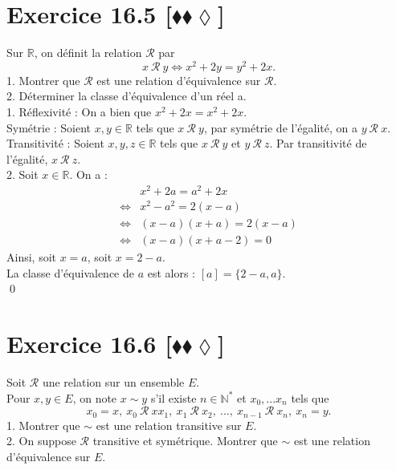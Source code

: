 \documentclass[10pt]{article}
\begin{document}
\section*{Exercice 16.5 [$\blacklozenge\blacklozenge\lozenge$]}
\begin{tcolorbox}[enhanced, width=7.6in, center, size=fbox, fontupper=\large, drop shadow southwest]
    Sur $\mathbb{R}$, on définit la relation $\mathcal{R}$ par
    \begin{equation*}
        x~\mathcal{R}~y \iff x^2 + 2y = y^2 + 2x.
    \end{equation*}
    1. Montrer que $\mathcal{R}$ est une relation d'équivalence sur $\mathcal{R}$.\\
    2. Déterminer la classe d'équivalence d'un réel a.\\[0.15cm]
    1. Réflexivité : On a bien que $x^2 + 2x = x^2 + 2x$.\\
    Symétrie : Soient $x,y\in\mathbb{R}$ tels que $x~\mathcal{R}~y$, par symétrie de l'égalité, on a $y~\mathcal{R}~x$.\\
    Transitivité : Soient $x,y,z\in\mathbb{R}$ tels que $x~\mathcal{R}~y$ et $y~\mathcal{R}~z$. Par transitivité de l'égalité, $x~\mathcal{R}~z$.\\[0.15cm]
    2. Soit $x\in\mathbb{R}$. On a :
    \begin{align*}
        &x^2 + 2a = a^2 + 2x\\
        \iff&x^2 - a^2 = 2(x-a)\\
        \iff&(x-a)(x+a)=2(x-a)\\
        \iff&(x-a)(x+a-2)=0
    \end{align*}
    Ainsi, soit $x=a$, soit $x=2-a$.\\
    La classe d'équivalence de $a$ est alors : $[a]=\{2-a,a\}$.\\
    \qed
\end{tcolorbox}

\section*{Exercice 16.6 [$\blacklozenge\blacklozenge\lozenge$]}
\begin{tcolorbox}[enhanced, width=7.6in, center, size=fbox, fontupper=\large, drop shadow southwest]
    Soit $\mathcal{R}$ une relation sur un ensemble $E$.\\
    Pour $x,y\in E$, on note $x \sim y$ s'il existe $n\in\mathbb{N}^*$ et $x_0,...x_n$ tels que
    \begin{equation*}
        x_0 = x, ~ x_0 ~ \mathcal{R} ~ xx_1, ~ x_1 ~ \mathcal{R} ~ x_2, ~ ..., ~ x_{n-1} ~ \mathcal{R} ~ x_n, ~ x_n = y.
    \end{equation*}
    1. Montrer que $\sim$ est une relation transitive sur $E$.\\
    2. On suppose $\mathcal{R}$ transitive et symétrique. Montrer que $\sim$ est une relation d'équivalence sur $E$.
\end{tcolorbox}
\end{document}
